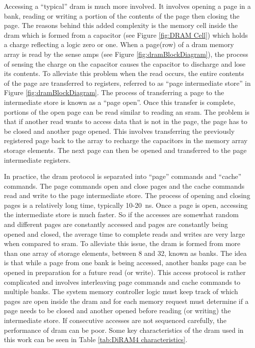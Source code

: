 Accessing a ``typical'' \ac{dram} is much more involved. It involves opening a page in a bank, reading or writing a portion of the contents of the page then closing the page. 
The reasons behind this added complexity is the memory cell inside the \ac{dram} which is formed from a capacitor (see Figure \ref{fig:DRAM Cell}) which holds a charge reflecting a logic zero or one. 
When a page(row) of a \ac{dram} memory array is read by the sense amps (see Figure \ref{fig:dramBlockDiagram}), the process of sensing the charge on the capacitor causes the capacitor to discharge and lose its contents. 
To alleviate this problem \iffalse \ac{dram} arrays are formed from a column of storage elements known as a page. \fi when the read occurs, the entire contents of the page are transferred to registers, referred to as ``page intermediate store'' in Figure \ref{fig:dramBlockDiagram}. 
The process of transferring a page to the intermediate store is known as a ``page open''.
Once this transfer is complete, portions of the open page can be read similar to reading an \ac{sram}. 
The problem is that if another read wants to access data that is not in the page, the page has to be closed and another page opened. 
This involves transferring the previously registered page back to the array to recharge the capacitors in the memory array storage elements. 
The next page can then be opened and transferred to the page intermediate registers.

In practice, the \ac{dram} protocol is separated into ``page'' commands and ``cache'' commands. The page commands open and close pages and the cache commands read and write to the page intermediate store.
The process of opening and closing pages is a relatively long time, typically 10-20\SI[per-mode=symbol]{}{\nano\second}. Once a page is open, accessing the intermediate store is much faster.
So if the accesses are somewhat random and different pages are constantly accessed and pages are constantly being opened and closed, the average time to complete reads and writes are very large when compared to \ac{sram}.
To alleviate this issue, the \ac{dram} is formed from more than one array of storage elements, between 8 and 32, known as banks. The idea is that while a page from one bank is being accessed, another banks page can be opened in preparation for a future read (or write).
This access protocol is rather complicated and involves interleaving page commands and cache commands to multiple banks. 
The system memory controller logic must keep track of which pages are open inside the \ac{dram} and for each memory request must determine if a page needs to be closed and another opened before reading (or writing) the intermediate store.
If consecutive accesses are not sequenced carefully, the performance of \ac{dram} can be poor.
Some key characteristics of the \ac{dram} used in this work can be seen in Table \ref{tab:DiRAM4 characteristics}. 


